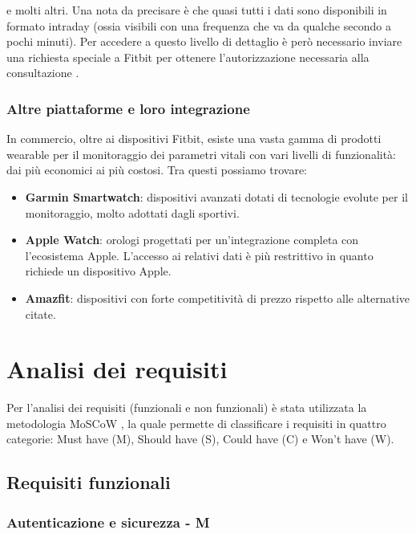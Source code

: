 \documentclass[12pt,a4paper,oneside]{report}
\begin{document}
e molti altri.
Una nota da precisare è che quasi tutti i dati sono disponibili in formato intraday (ossia visibili con una frequenza che va da qualche secondo a pochi minuti). Per accedere a questo livello di dettaglio è però necessario inviare una richiesta speciale a Fitbit per ottenere l'autorizzazione necessaria alla consultazione \cite{fitbitapi}.

\subsection{Altre piattaforme e loro integrazione}

In commercio, oltre ai dispositivi Fitbit, esiste una vasta gamma di prodotti wearable per il monitoraggio dei parametri vitali con vari livelli di funzionalità: dai più economici ai più costosi. Tra questi possiamo trovare:

\begin{itemize}
  \item \textbf{Garmin Smartwatch}: dispositivi avanzati dotati di tecnologie evolute per il monitoraggio, molto adottati dagli sportivi. \cite{mysql}
  \item \textbf{Apple Watch}: orologi progettati per un'integrazione completa con l'ecosistema Apple. L'accesso ai relativi dati è più restrittivo in quanto richiede un dispositivo Apple. \cite{applewatch}
  \item \textbf{Amazfit}: dispositivi con forte competitività di prezzo rispetto alle alternative citate. \cite{amazfit}
\end{itemize}



\chapter{Analisi dei requisiti}
Per l'analisi dei requisiti (funzionali e non funzionali) è stata utilizzata la metodologia MoSCoW \cite{moscow}, la quale permette di classificare i requisiti in quattro categorie: Must have (M), Should have (S), Could have (C) e Won't have (W).

\section{Requisiti funzionali}

\subsection{Autenticazione e sicurezza - M}
\end{document}
